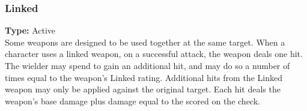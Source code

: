 \subsubsection{Linked}
\label{iqty:linked}
\textbf{Type:} Active\\
Some weapons are designed to be used together
at the same target. When a character uses a linked
weapon, on a successful attack, the weapon deals
one hit. The wielder may spend \advantage\advantage
to gain an additional hit, and may do so a number of
times equal to the weapon's Linked rating. Additional
hits from the Linked weapon may only be applied against
the original target. Each hit deals the weapon's base
damage plus damage equal to the \success scored on the
check.
